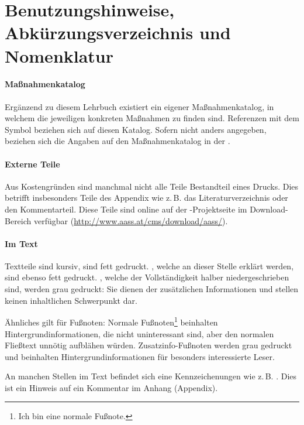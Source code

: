 

\section{Benutzungshinweise, Abkürzungsverzeichnis und Nomenklatur}

\paragraph{Maßnahmenkatalog}
{Ergänzend zu diesem Lehrbuch existiert ein eigener
Maßnahmenkatalog, in welchem die jeweiligen konkreten
Maßnahmen zu finden sind. Referenzen mit dem Symbol
{\SignMassnahme} beziehen sich auf diesen Katalog. Sofern
nicht anders angegeben, beziehen sich die Angaben auf den 
Maßnahmenkatalog in der .

}
{}
{}
{}
{}

\paragraph{Externe Teile}
{Aus Kostengründen sind manchmal nicht
alle Teile Bestandteil eines Drucks. Dies betrifft
insbesonders Teile des Appendix wie z.\,B. das
Literaturverzeichnis oder den Kommentarteil. Diese Teile
sind online auf der {\AASS}-Projektseite im
Download-Bereich verfügbar
(\url{http://www.aass.at/cms/download/aass/}).

}
{}
{}
{}
{}

\paragraph{Im Text}{%
 Textteile sind kursiv,  sind fett gedruckt. , welche an
dieser Stelle erklärt werden, sind ebenso fett gedruckt.
, welche der Vollständigkeit halber
niedergeschrieben sind, werden grau gedruckt: Sie dienen der
zusätzlichen Informationen und stellen keinen inhaltlichen
Schwerpunkt dar. 

Ähnliches gilt für Fußnoten: Normale
Fußnoten\footnote{Ich bin eine normale Fußnote.} beinhalten
Hintergrundinformationen, die nicht uninteressant sind, aber
den normalen Fließtext  unnötig aufblähen würden.
Zusatzinfo-Fußnoten werden grau gedruckt und beinhalten
Hintergrundinformationen für besonders interessierte Leser.

An manchen Stellen im Text befindet sich eine
Kennzeichenungen wie z.\,B.
. Dies ist ein
Hinweis auf ein Kommentar im Anhang (Appendix).

}{}{}{}{}

